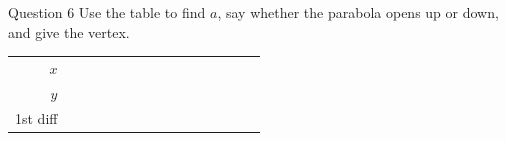 \documentclass[11pt]{article}
\begin{document}
\begin{qbox}{Question 6}
Use the table to find $a$, say whether the parabola opens up or down, and give the vertex.
\begin{center}\renewcommand{\arraystretch}{1.15}\setlength{\tabcolsep}{2pt}\begin{tabular}{r|>{\centering\arraybackslash}p{0.62cm}>{\centering\arraybackslash}p{0.62cm}>{\centering\arraybackslash}p{0.62cm}>{\centering\arraybackslash}p{0.62cm}>{\centering\arraybackslash}p{0.62cm}>{\centering\arraybackslash}p{0.62cm}>{\centering\arraybackslash}p{0.62cm}>{\centering\arraybackslash}p{0.62cm}>{\centering\arraybackslash}p{0.62cm}>{\centering\arraybackslash}p{0.62cm}>{\centering\arraybackslash}p{0.62cm}>{\centering\arraybackslash}p{0.62cm}>{\centering\arraybackslash}p{0.62cm}>{\centering\arraybackslash}p{0.62cm}}
$x$ & \multicolumn{2}{c}{\colorbox{iagreen}{\makebox[1.12cm]{\strut \color{white}\bfseries $0$}}} & \multicolumn{2}{c}{\colorbox{iagreen}{\makebox[1.12cm]{\strut \color{white}\bfseries $1$}}} & \multicolumn{2}{c}{\colorbox{iagreen}{\makebox[1.12cm]{\strut \color{white}\bfseries $2$}}} & \multicolumn{2}{c}{\colorbox{iagreen}{\makebox[1.12cm]{\strut \color{white}\bfseries $3$}}} & \multicolumn{2}{c}{\colorbox{iagreen}{\makebox[1.12cm]{\strut \color{white}\bfseries $4$}}} & \multicolumn{2}{c}{\colorbox{iagreen}{\makebox[1.12cm]{\strut \color{white}\bfseries $5$}}} & \multicolumn{2}{c}{\colorbox{iagreen}{\makebox[1.12cm]{\strut \color{white}\bfseries $6$}}} \\[2pt]
$y$ & \multicolumn{2}{c}{\colorbox{keybg}{\makebox[1.12cm]{\strut $-4$}}} & \multicolumn{2}{c}{\colorbox{keybg}{\makebox[1.12cm]{\strut $1$}}} & \multicolumn{2}{c}{\colorbox{keybg}{\makebox[1.12cm]{\strut $4$}}} & \multicolumn{2}{c}{\colorbox{keybg}{\makebox[1.12cm]{\strut $5$}}} & \multicolumn{2}{c}{\colorbox{keybg}{\makebox[1.12cm]{\strut $4$}}} & \multicolumn{2}{c}{\colorbox{keybg}{\makebox[1.12cm]{\strut $1$}}} & \multicolumn{2}{c}{\colorbox{keybg}{\makebox[1.12cm]{\strut $-4$}}} \\[2pt]
\textcolor{exblue}{\scriptsize 1st diff} & & \multicolumn{2}{c}{\colorbox{exbg}{\makebox[1.12cm]{\strut \textcolor{exblue}{$+5$}}}} & \multicolumn{2}{c}{\colorbox{exbg}{\makebox[1.12cm]{\strut \textcolor{exblue}{$+3$}}}} & \multicolumn{2}{c}{\colorbox{exbg}{\makebox[1.12cm]{\strut \textcolor{exblue}{$+1$}}}} & \multicolumn{2}{c}{\colorbox{exbg}{\makebox[1.12cm]{\strut \textcolor{exblue}{$-1$}}}} & \multicolumn{2}{c}{\colorbox{exbg}{\makebox[1.12cm]{\strut \textcolor{exblue}{$-3$}}}} & \multicolumn{2}{c}{\colorbox{exbg}{\makebox[1.12cm]{\strut \textcolor{exblue}{$-5$}}}} & \\[2pt]

\end{tabular}
\end{center}
\end{qbox}
\end{document}
